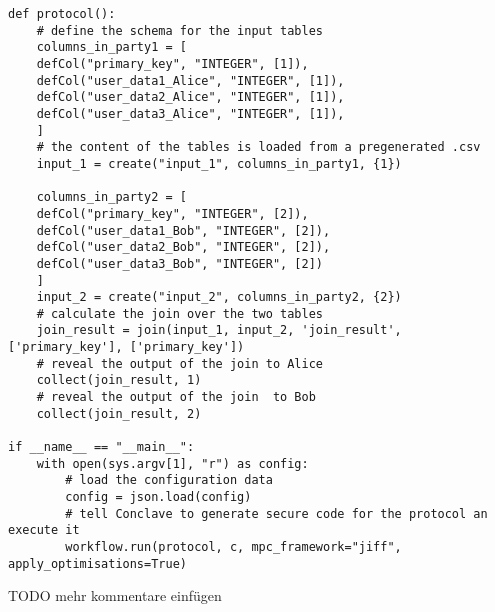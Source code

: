 \begin{lstlisting}[caption={ The Python protocol of Conclave for our first use-case    }]
def protocol():
	# define the schema for the input tables 
	columns_in_party1 = [
	defCol("primary_key", "INTEGER", [1]),
	defCol("user_data1_Alice", "INTEGER", [1]),
	defCol("user_data2_Alice", "INTEGER", [1]),
	defCol("user_data3_Alice", "INTEGER", [1]),
	]
	# the content of the tables is loaded from a pregenerated .csv
	input_1 = create("input_1", columns_in_party1, {1})
	
	columns_in_party2 = [
	defCol("primary_key", "INTEGER", [2]),
	defCol("user_data1_Bob", "INTEGER", [2]),
	defCol("user_data2_Bob", "INTEGER", [2]),
	defCol("user_data3_Bob", "INTEGER", [2])
	]
	input_2 = create("input_2", columns_in_party2, {2})
	# calculate the join over the two tables 
	join_result = join(input_1, input_2, 'join_result', ['primary_key'], ['primary_key'])
	# reveal the output of the join to Alice
	collect(join_result, 1)
	# reveal the output of the join  to Bob
	collect(join_result, 2)
	
if __name__ == "__main__":
	with open(sys.argv[1], "r") as config:
		# load the configuration data
		config = json.load(config)
		# tell Conclave to generate secure code for the protocol an execute it
		workflow.run(protocol, c, mpc_framework="jiff", apply_optimisations=True)
\end{lstlisting}
TODO mehr kommentare einfügen	
